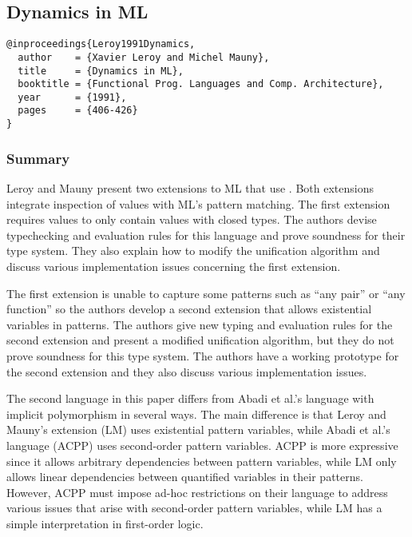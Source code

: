 \documentclass[letterpaper]{llncs}
\begin{document}
\subsection*{Dynamics in ML}%
\begin{verbatim}
@inproceedings{Leroy1991Dynamics,
  author    = {Xavier Leroy and Michel Mauny},
  title     = {Dynamics in ML},
  booktitle = {Functional Prog. Languages and Comp. Architecture},
  year      = {1991},
  pages     = {406-426}
}
\end{verbatim}

\newcommand{\mlcode}[1]{$\mathtt{#1}$}


\subsubsection*{Summary}
Leroy and Mauny present two extensions to ML that use \Dynamic. Both extensions integrate inspection of \Dynamic values with ML's pattern matching. The first extension requires \Dynamic values to only contain values with closed types. The authors devise typechecking and evaluation rules for this language and prove soundness for their type system. They also explain how to modify the unification algorithm and discuss various implementation issues concerning the first extension.

The first extension is unable to capture some patterns such as ``any pair'' or ``any function'' so the authors develop a second extension that allows existential variables in patterns. The authors give new typing and evaluation rules for the second extension and present a modified unification algorithm, but they do not prove soundness for this type system. The authors have a working prototype for the second extension and they also discuss various implementation issues.

The second language in this paper differs from Abadi et al.'s language with implicit polymorphism in several ways. The main difference is that Leroy and Mauny's extension (LM) uses existential pattern variables, while Abadi et al.'s language (ACPP) uses second-order pattern variables. ACPP is more expressive since it allows arbitrary dependencies between pattern variables, while LM only allows linear dependencies between quantified variables in their patterns. However, ACPP must impose ad-hoc restrictions on their language to address various issues that arise with second-order pattern variables, while LM has a simple interpretation in first-order logic.
\end{document}
